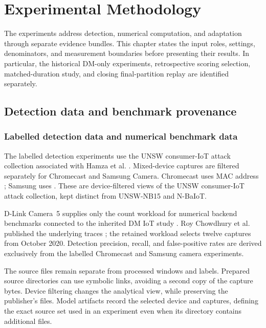 \chapter{Experimental Methodology}
\label{ch:experiments}
The experiments address detection, numerical computation, and adaptation
through separate evidence bundles. This chapter states the input roles, settings,
denominators, and measurement boundaries before presenting their results.
In particular, the historical DM-only experiments, retrospective scoring
selection, matched-duration study, and closing final-partition replay are
identified separately.

\section{Detection data and benchmark provenance}
\label{sec:experimental-data}

\subsection{Labelled detection data and numerical benchmark data}

The labelled detection experiments use the UNSW consumer-IoT attack
collection associated with Hamza et al. \cite{hamza2019,unswattackdata}. Mixed-device
captures are filtered separately for Chromecast and Samsung Camera.
Chromecast uses MAC address ; Samsung uses
. These are device-filtered views of the UNSW
consumer-IoT attack collection, kept distinct from UNSW-NB15 and N-BaIoT.

D-Link Camera~5 supplies only the count workload for numerical backend
benchmarks connected to the inherited DM IoT study
\cite{alhajbaddar2025iot}. Roy Chowdhury et al. published the underlying
traces \cite{chowdhury2021data}; the retained workload selects twelve
captures from October 2020. Detection precision, recall, and false-positive
rates are derived exclusively from the labelled Chromecast and Samsung
camera experiments.

The source files remain separate from processed windows and labels.
Prepared source directories can use symbolic links, avoiding a second
copy of the capture bytes. Device filtering changes the analytical view,
while preserving the publisher's files. Model artifacts record the selected
device and captures, defining the exact source set used in an experiment even
when its directory contains additional files.

